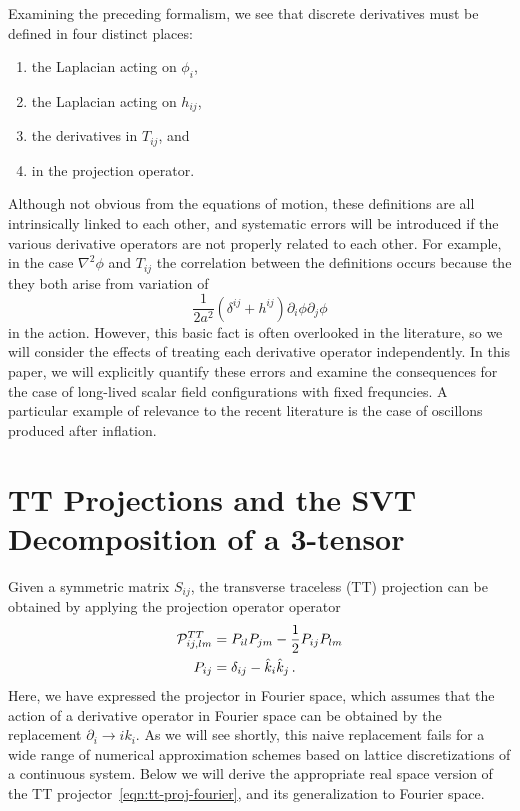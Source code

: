 \documentclass{revtex4}
\begin{document}
Examining the preceding formalism, we see that discrete derivatives must be defined in four distinct places:
\begin{enumerate}
\item the Laplacian acting on $\phi_i$,
\item the Laplacian acting on $h_{ij}$,
\item the derivatives in $T_{ij}$, and
\item in the projection operator.
\end{enumerate}
Although not obvious from the equations of motion, these definitions are all intrinsically linked to each other, and systematic errors will be introduced if the various derivative operators are not properly related to each other.
For example, in the case $\nabla^2\phi$ and $T_{ij}$ the correlation between the definitions occurs because the they both arise from variation of
\begin{equation}
  \frac{1}{2a^2}\left(\delta^{ij}+h^{ij}\right)\partial_i\phi\partial_j\phi
\end{equation}
in the action.
However, this basic fact is often overlooked in the literature, so we will consider the effects of treating each derivative operator independently.
In this paper, we will explicitly quantify these errors and examine the consequences for the case of long-lived scalar field configurations with fixed frequncies.
A particular example of relevance to the recent literature is the case of oscillons produced after inflation.

\section{TT Projections and the SVT Decomposition of a 3-tensor}
Given a symmetric matrix $S_{ij}$, the transverse traceless (TT) projection can be obtained by applying the projection operator operator
\begin{align}
  \label{eqn:tt-proj-fourier}
  \mathcal{P}^{TT}_{ij,lm} &= P_{il}P_{jm} - \frac{1}{2}P_{ij}P_{lm} \\
  P_{ij} &= \delta_{ij} - \hat{k}_i\hat{k}_j \, .
\end{align}
Here, we have expressed the projector in Fourier space, which assumes that the action of a derivative operator in Fourier space can be obtained by the replacement $\partial_i \to ik_i$.
As we will see shortly, this naive replacement fails for a wide range of numerical approximation schemes based on lattice discretizations of a continuous system.
Below we will derive the appropriate real space version of the TT projector~\eqref{eqn:tt-proj-fourier}, and its generalization to Fourier space.
\end{document}
